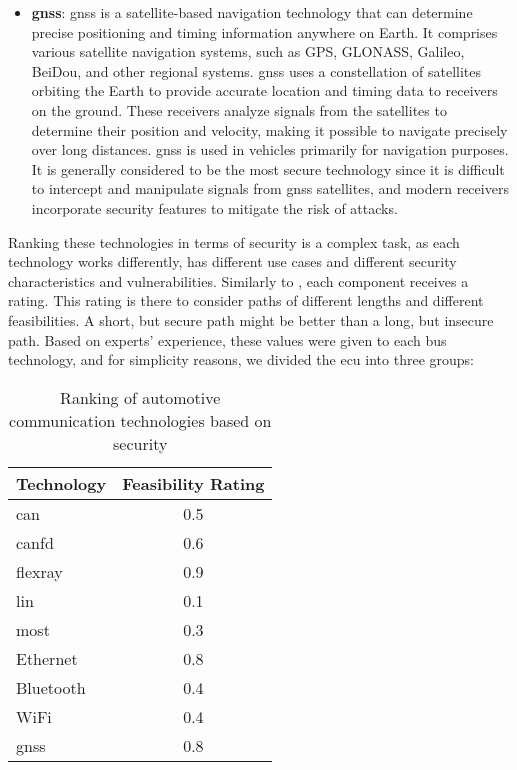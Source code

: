 \begin{itemize}
    \item \textbf{\acrlong{gnss}}: \acrshort{gnss} is a satellite-based navigation technology that can determine precise positioning and timing information anywhere on Earth. 
    It comprises various satellite navigation systems, such as GPS, GLONASS, Galileo, BeiDou, and other regional systems.
    \acrshort{gnss} uses a constellation of satellites orbiting the Earth to provide accurate location and timing data to receivers on the ground. 
    These receivers analyze signals from the satellites to determine their position and velocity, making it possible to navigate precisely over long distances.
    \acrshort{gnss} is used in vehicles primarily for navigation purposes.
    It is generally considered to be the most secure technology since it is difficult to intercept and manipulate signals from \acrshort{gnss} satellites, 
    and modern receivers incorporate security features to mitigate the risk of attacks.

\end{itemize}
    
Ranking these technologies in terms of security is a complex task, as each technology works differently,
has different use cases and different security characteristics and vulnerabilities.
Similarly to \cite{threat_surf}, each component receives a rating.
This rating is there to consider paths of different lengths and different feasibilities.
A short, but secure path might be better than a long, but insecure path.
Based on experts' experience, these values were given to each bus technology, and for 
simplicity reasons, we divided the \acrshort{ecu} into three groups:

\begin{table}[h]
    \label{table:bus_rating}
    \centering
    \begin{tabular}{|l|c|}
    \hline
    \textbf{Technology} & \textbf{Feasibility Rating} \\
    \hline
    \acrshort{can} & 0.5 \\
    \acrshort{canfd} & 0.6 \\
    \acrshort{flexray} & 0.9 \\
    \acrshort{lin} & 0.1 \\
    \acrshort{most} & 0.3 \\
    Ethernet & 0.8 \\
    Bluetooth & 0.4 \\
    WiFi & 0.4 \\
    \acrshort{gnss} & 0.8 \\
    \hline
    \end{tabular}
    \caption{Ranking of automotive communication technologies based on security}
\end{table}

